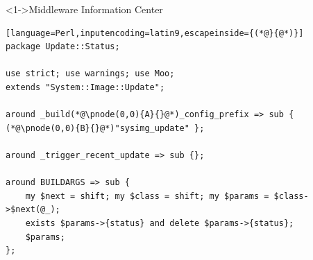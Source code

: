 \documentclass[ngerman,xcolor={table,dvipsnames},smaller,compress,hyperref={bookmarks,colorlinks}]{beamer}%
\begin{document}
\begin{frame}[t,fragile]

\begin{block}<1->{Middleware Information Center}
\scriptsize
\begin{lstlisting}[language=Perl,inputencoding=latin9,escapeinside={(*@}{@*)}]
package Update::Status;

use strict; use warnings; use Moo;
extends "System::Image::Update";

around _build(*@\pnode(0,0){A}{}@*)_config_prefix => sub { (*@\pnode(0,0){B}{}@*)"sysimg_update" };

around _trigger_recent_update => sub {};

around BUILDARGS => sub {
    my $next = shift; my $class = shift; my $params = $class->$next(@_);
    exists $params->{status} and delete $params->{status};
    $params;
};
\end{lstlisting}
\end{block}

\begin{itemize}
\end{itemize}

\end{frame}
\end{document}
